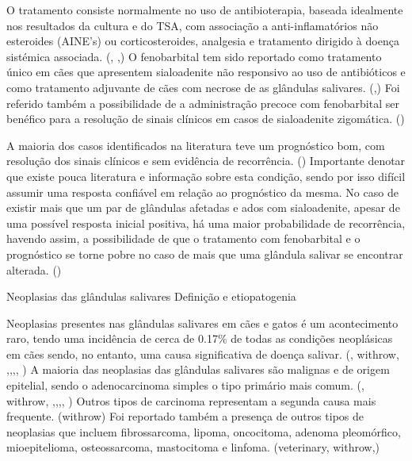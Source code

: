 O tratamento consiste normalmente no uso de antibioterapia, baseada idealmente nos resultados da cultura e do TSA, com associação a anti-inflamatórios não esteroides (AINE’s) ou corticosteroides, analgesia e tratamento dirigido à doença sistémica associada. (\cite{Park2022}, \cite{Enache2025},\cite{sialadenite}) O fenobarbital tem sido reportado como tratamento único em cães que apresentem sialoadenite não responsivo ao uso de antibióticos e como tratamento adjuvante de cães com necrose de as glândulas salivares. (\cite{Park2022},\cite{Enache2025}) Foi referido também a possibilidade de a administração precoce com fenobarbital ser benéfico para a resolução de sinais clínicos em casos de sialoadenite zigomática. (\cite{Martinez2018})


A maioria dos casos identificados na literatura teve um prognóstico bom, com resolução dos sinais clínicos e sem evidência de recorrência. (\cite{sialadenite}) Importante denotar que existe pouca literatura e informação sobre esta condição, sendo por isso difícil assumir uma resposta confiável em relação ao prognóstico da mesma.   
No caso de existir mais que um par de glândulas afetadas e \cite{Kumar2017}ados com sialoadenite, apesar de uma possível resposta inicial positiva, há uma maior probabilidade de recorrência, havendo assim, a possibilidade de que o tratamento com fenobarbital e o prognóstico se torne pobre no caso de mais que uma glândula salivar se encontrar alterada. (\cite{Park2022})

  
Neoplasias das glândulas salivares
Definição e etiopatogenia


Neoplasias presentes nas glândulas salivares em cães e gatos é um acontecimento raro, tendo uma incidência de cerca de 0.17\% de todas as condições neoplásicas em cães sendo, no entanto, uma causa significativa de doença salivar. (\cite{Almeida2010}, withrow, \cite{Oshikata2006},\cite{Hammer2001},\cite{campos2019},\cite{Cray2020}, \cite{deLaPuerta2020}) A maioria das neoplasias das glândulas salivares são malignas e de origem epitelial, sendo o adenocarcinoma simples o tipo primário mais comum. (\cite{Almeida2010}, withrow, \cite{Oshikata2006},\cite{Hammer2001},\cite{campos2019},\cite{Cray2020}, \cite{deLaPuerta2020}) Outros tipos de carcinoma representam a segunda causa mais frequente. (withrow) Foi reportado também a presença de outros tipos de neoplasias que incluem fibrossarcoma, lipoma, oncocitoma, adenoma pleomórfico, mioepitelioma, osteossarcoma, mastocitoma e linfoma. (veterinary, withrow,\cite{Cray2020})


